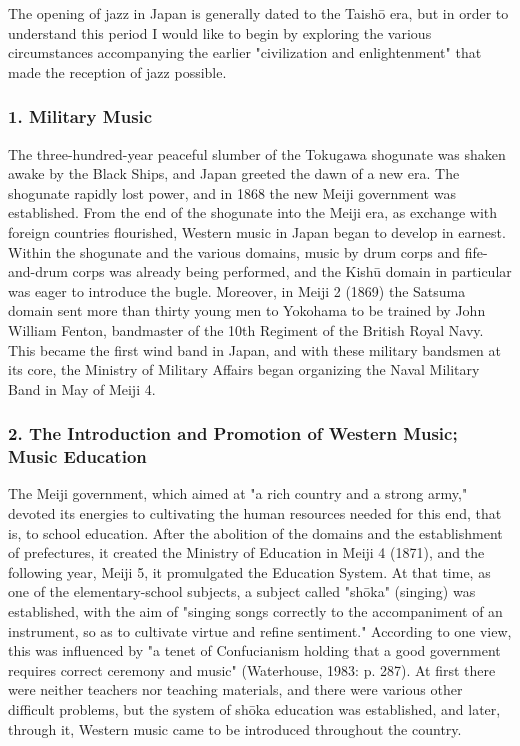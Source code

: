 The opening of jazz in Japan is generally dated to the Taishō era, but in order to understand this period I would like to begin by exploring the various circumstances accompanying the earlier "civilization and enlightenment" that made the reception of jazz possible.

\subsubsection{1. Military Music}

The three-hundred-year peaceful slumber of the Tokugawa shogunate was shaken awake by the Black Ships, and Japan greeted the dawn of a new era. The shogunate rapidly lost power, and in 1868 the new Meiji government was established. From the end of the shogunate into the Meiji era, as exchange with foreign countries flourished, Western music in Japan began to develop in earnest. Within the shogunate and the various domains, music by drum corps and fife-and-drum corps was already being performed, and the Kishū domain in particular was eager to introduce the bugle. Moreover, in Meiji 2 (1869) the Satsuma domain sent more than thirty young men to Yokohama to be trained by John William Fenton, bandmaster of the 10th Regiment of the British Royal Navy. This became the first wind band in Japan, and with these military bandsmen at its core, the Ministry of Military Affairs began organizing the Naval Military Band in May of Meiji 4.

\subsubsection{2. The Introduction and Promotion of Western Music; Music Education}

The Meiji government, which aimed at "a rich country and a strong army," devoted its energies to cultivating the human resources needed for this end, that is, to school education. After the abolition of the domains and the establishment of prefectures, it created the Ministry of Education in Meiji 4 (1871), and the following year, Meiji 5, it promulgated the Education System. At that time, as one of the elementary-school subjects, a subject called "shōka" (singing) was established, with the aim of "singing songs correctly to the accompaniment of an instrument, so as to cultivate virtue and refine sentiment." According to one view, this was influenced by "a tenet of Confucianism holding that a good government requires correct ceremony and music" (Waterhouse, 1983: p. 287). At first there were neither teachers nor teaching materials, and there were various other difficult problems, but the system of shōka education was established, and later, through it, Western music came to be introduced throughout the country.

